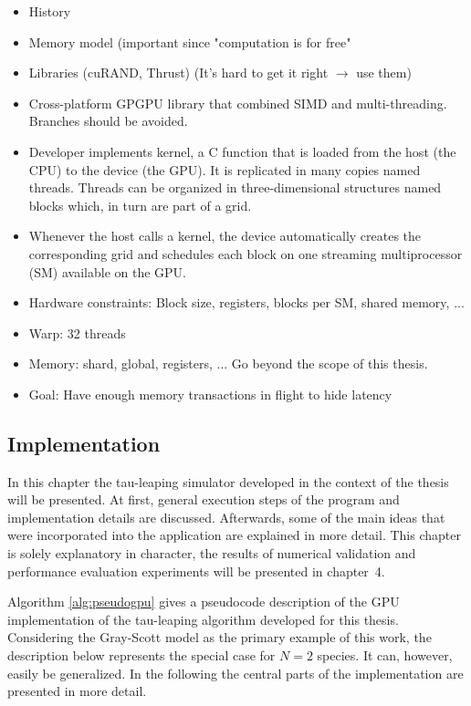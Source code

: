 \ifdebug
\begin{itemize}
\item History
\item Memory model (important since "computation is for free"
\item Libraries (cuRAND, Thrust) (It's hard to get it right $\rightarrow$ use them)
\item Cross-platform GPGPU library that combined SIMD and multi-threading. Branches should be avoided. 
\item Developer implements kernel, a C function that is loaded from the host (the CPU) to the device (the GPU). It is replicated in many copies named threads. Threads can be organized in three-dimensional structures named blocks which, in turn are part of a grid. 
\item Whenever the host calls a kernel, the device automatically creates the corresponding grid and schedules each block on one streaming multiprocessor (SM) available on the GPU. 
\item Hardware constraints: Block size, registers, blocks per SM, shared memory, ...
\item Warp: 32 threads
\item Memory: shard, global, registers, ... Go beyond the scope of this thesis. 
\item Goal: Have enough memory transactions in flight to hide latency
\end{itemize}
\fi

\subsection{Implementation}
\label{ch:gpuimplementation}
In this chapter the tau-leaping simulator developed in the context of the thesis will be presented. At first, general execution steps of the program and implementation details are discussed. Afterwards, some of the main ideas that were incorporated into the application are explained in more detail. This chapter is solely explanatory in character, the results of numerical validation and performance evaluation experiments will be presented in chapter~4. 

Algorithm \ref{alg:pseudogpu} gives a pseudocode description of the GPU implementation of the tau-leaping algorithm developed for this thesis. Considering the Gray-Scott model as the primary example of this work, the description below represents the special case for $N = 2$ species. It can, however, easily be generalized. In the following the central parts of the implementation are presented in more detail. 

